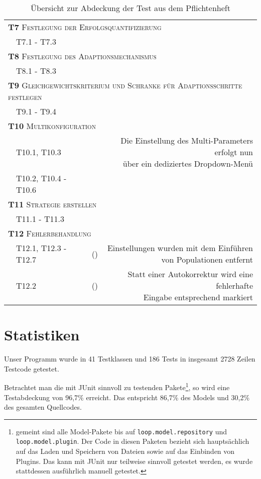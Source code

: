 \documentclass[parskip=full,11pt,openany]{scrreprt}
\newcommand{\cmark}{\ding{51}}%
\newcommand{\xmark}{\ding{55}}%
\begin{document}
\begin{table}
\begin{tabular}{@{}ll|c|r@{}}
		\multicolumn{4}{l}{\small \textsc{\textbf{T7} Festlegung der Erfolgsquantifizierung}}\\ 
		&T7.1 - T7.3 & \cmark & \\
		\multicolumn{4}{l}{\small \textsc{\textbf{T8} Festlegung des Adaptionsmechanismus}}\\ 
		&T8.1 - T8.3 & \cmark & \\
		\multicolumn{4}{l}{\small \textsc{\textbf{T9} Gleichgewichtskriterium und Schranke für Adaptionsschritte festlegen}}\\ 
		&T9.1 - T9.4 & \cmark & \\
		\multicolumn{3}{l|}{\small \textsc{\textbf{T10} Multikonfiguration}}\\ 
		&T10.1, T10.3 & \cmark & \makecell{Die Einstellung des Multi-Parameters erfolgt nun\\ über ein dediziertes Dropdown-Menü}\\
		&T10.2, T10.4 - T10.6 & \cmark & \\
		\multicolumn{3}{l|}{\small \textsc{\textbf{T11} Strategie erstellen}}\\
		&T11.1 - T11.3 & \cmark & \\
		\multicolumn{3}{l|}{\small \textsc{\textbf{T12} Fehlerbehandlung}}\\ 
		&T12.1, T12.3 - T12.7 & (\xmark) & \makecell{Einstellungen wurden mit dem Einführen\\ von Populationen entfernt}\\
		&T12.2 & (\cmark) & \makecell{Statt einer Autokorrektur wird eine fehlerhafte\\ Eingabe entsprechend markiert}\\
		\bottomrule
	\end{tabular}
	\caption{Übersicht zur Abdeckung der Test aus dem Pflichtenheft}
	\label{testtabelle}
\end{table}

\section{Statistiken}\label{statistics}

Unser Programm wurde in 41 Testklassen und 186 Tests in insgesamt 2728 Zeilen Testcode getestet.

Betrachtet man die mit JUnit sinnvoll zu testenden Pakete\footnote{gemeint sind alle Model-Pakete bis auf \texttt{loop.model.repository} und \texttt{loop.model.plugin}. Der Code in diesen Paketen bezieht sich hauptsächlich auf das Laden und Speichern von Dateien sowie auf das Einbinden von Plugins. Das kann mit JUnit nur teilweise sinnvoll getestet werden, es wurde stattdessen ausführlich manuell getestet.}, so wird eine Testabdeckung von 96,7\% erreicht. Das entspricht 86,7\% des Models und 30,2\% des gesamten Quellcodes.
\end{document}
